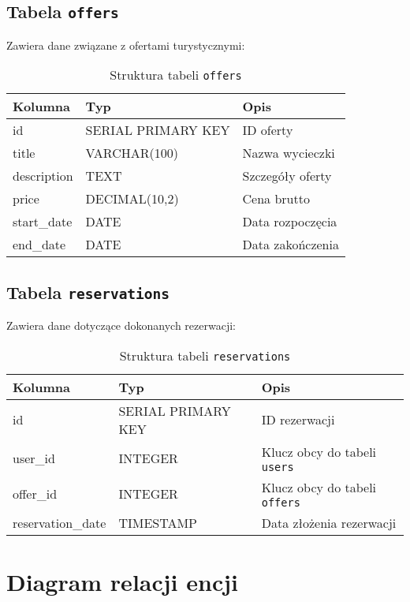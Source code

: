 \subsection{Tabela \texttt{offers}}

Zawiera dane związane z ofertami turystycznymi:

\begin{table}[H]
\centering
\begin{tabular}{|l|l|l|}
\hline
\textbf{Kolumna} & \textbf{Typ} & \textbf{Opis} \\ \hline
id & SERIAL PRIMARY KEY & ID oferty \\
title & VARCHAR(100) & Nazwa wycieczki \\
description & TEXT & Szczegóły oferty \\
price & DECIMAL(10,2) & Cena brutto \\
start\_date & DATE & Data rozpoczęcia \\
end\_date & DATE & Data zakończenia \\ \hline
\end{tabular}
\caption{Struktura tabeli \texttt{offers}}
\end{table}

\subsection{Tabela \texttt{reservations}}

Zawiera dane dotyczące dokonanych rezerwacji:

\begin{table}[H]
\centering
\begin{tabular}{|l|l|l|}
\hline
\textbf{Kolumna} & \textbf{Typ} & \textbf{Opis} \\ \hline
id & SERIAL PRIMARY KEY & ID rezerwacji \\
user\_id & INTEGER & Klucz obcy do tabeli \texttt{users} \\
offer\_id & INTEGER & Klucz obcy do tabeli \texttt{offers} \\
reservation\_date & TIMESTAMP & Data złożenia rezerwacji \\ \hline
\end{tabular}
\caption{Struktura tabeli \texttt{reservations}}
\end{table}

\section{Diagram relacji encji}

